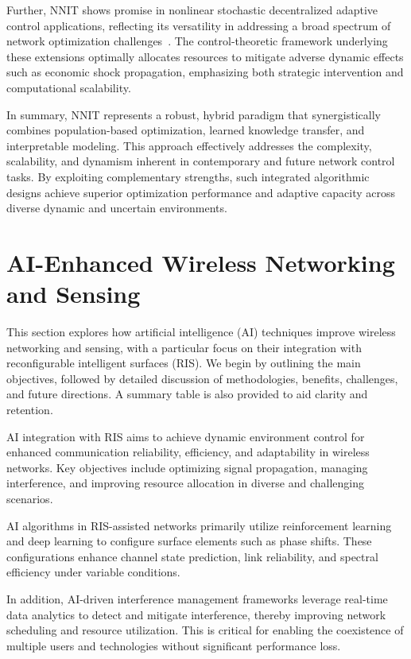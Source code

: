 \documentclass[sigconf]{acmart}
\begin{document}
Further, NNIT shows promise in nonlinear stochastic decentralized adaptive control applications, reflecting its versatility in addressing a broad spectrum of network optimization challenges~\cite{ref40}. The control-theoretic framework underlying these extensions optimally allocates resources to mitigate adverse dynamic effects such as economic shock propagation, emphasizing both strategic intervention and computational scalability.

In summary, NNIT represents a robust, hybrid paradigm that synergistically combines population-based optimization, learned knowledge transfer, and interpretable modeling. This approach effectively addresses the complexity, scalability, and dynamism inherent in contemporary and future network control tasks. By exploiting complementary strengths, such integrated algorithmic designs achieve superior optimization performance and adaptive capacity across diverse dynamic and uncertain environments.

\section{AI-Enhanced Wireless Networking and Sensing}

This section explores how artificial intelligence (AI) techniques improve wireless networking and sensing, with a particular focus on their integration with reconfigurable intelligent surfaces (RIS). We begin by outlining the main objectives, followed by detailed discussion of methodologies, benefits, challenges, and future directions. A summary table is also provided to aid clarity and retention.

AI integration with RIS aims to achieve dynamic environment control for enhanced communication reliability, efficiency, and adaptability in wireless networks. Key objectives include optimizing signal propagation, managing interference, and improving resource allocation in diverse and challenging scenarios.

AI algorithms in RIS-assisted networks primarily utilize reinforcement learning and deep learning to configure surface elements such as phase shifts. These configurations enhance channel state prediction, link reliability, and spectral efficiency under variable conditions.

In addition, AI-driven interference management frameworks leverage real-time data analytics to detect and mitigate interference, thereby improving network scheduling and resource utilization. This is critical for enabling the coexistence of multiple users and technologies without significant performance loss.
\end{document}
